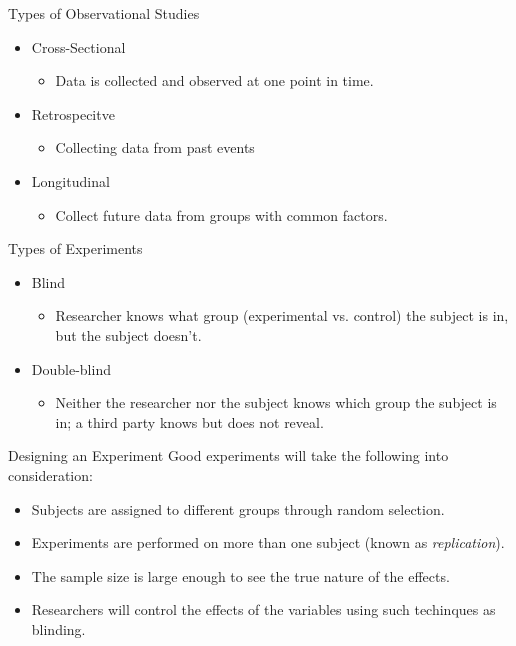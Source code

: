 \documentclass[t]{beamer}
\begin{document}
\begin{frame}{Types of Observational Studies}
\begin{itemize}
	\item Cross-Sectional
		\begin{itemize}
		\item<+-> Data is collected and observed at one point in time. 
		\end{itemize}
	\item<+-> Retrospecitve
		\begin{itemize}
		\item<+-> Collecting data from past events 
		\end{itemize}
	\item<+-> Longitudinal
		\begin{itemize}
		\item<+-> Collect future data from groups with common factors.
		\end{itemize}
\end{itemize}
\end{frame}

\begin{frame}{Types of Experiments}
\begin{itemize}
	\item<+-> Blind
	\begin{itemize}
		\item<+-> Researcher knows what group (experimental vs. control) the subject is in, but the subject doesn't.
	\end{itemize}
	\item<+-> Double-blind
	\begin{itemize}
		\item<+-> Neither the researcher nor the subject knows which group the subject is in; a third party knows but does not reveal. 
	\end{itemize}
\end{itemize}
\end{frame}

\begin{frame}{Designing an Experiment}
Good experiments will take the following into consideration:
\begin{itemize}
	\item<+-> Subjects are assigned to different groups through random selection.
	\item<+-> Experiments are performed on more than one subject (known as \textit{replication}).
	\item<+-> The sample size is large enough to see the true nature of the effects.
	\item<+-> Researchers will control the effects of the variables using such techinques as blinding.
\end{itemize}
\end{frame}
\end{document}
